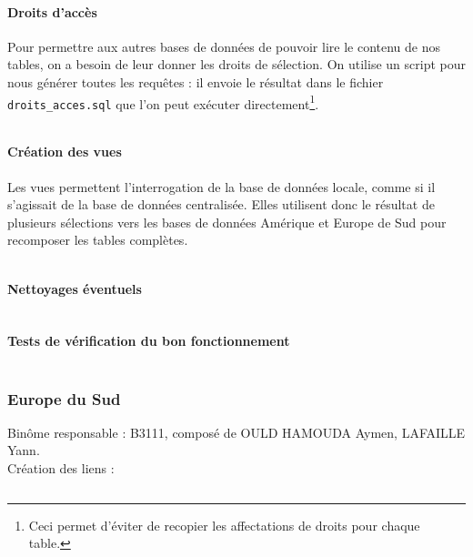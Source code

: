 \documentclass[10pt,a4paper]{article}
\theoremstyle{plain}
\begin{document}
\inputminted{sql}{INSA-DB12-EuropeNord-contraintes.sql}

\newpage

\paragraph{Droits d'accès}

Pour permettre aux autres bases de données de pouvoir lire le contenu de nos tables, on a besoin de leur donner les droits de sélection. On utilise un script pour nous générer toutes les requêtes : il envoie le résultat dans le fichier \verb|droits_acces.sql| que l'on peut exécuter directement\footnote{Ceci permet d'éviter de recopier les affectations de droits pour chaque table.}.
\inputminted{sql}{INSA-DB12-droits-acces.sql}
\newpage

\paragraph{Création des vues}

Les vues permettent l'interrogation de la base de données locale, comme si il s'agissait de la base de données centralisée. Elles utilisent donc le résultat de plusieurs sélections vers les bases de données Amérique et Europe de Sud pour recomposer les tables complètes.

\inputminted{sql}{INSA-DB12-EuropeNord-vues.sql}

\newpage

\paragraph{Nettoyages éventuels}

\inputminted{sql}{INSA-DB12-EuropeNord-drop.sql}

\paragraph{Tests de vérification du bon fonctionnement}

\inputminted{sql}{INSA-DB12-EuropeNord-bon-fonctionnement.sql}
\newpage

\subsubsection{Europe du Sud}
Binôme responsable : B3111, composé de OULD HAMOUDA Aymen, LAFAILLE Yann.\\

Création des liens :
\inputminted{sql}{EUS_III-C-2-creation_liens.sql}
\newpage
\end{document}
